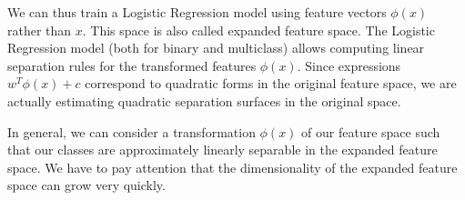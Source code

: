 We can thus train a Logistic Regression model using feature vectors $\phi(x)$ rather than $x$. This space is also called expanded feature space. The Logistic Regression model (both for binary and multiclass) allows computing linear separation rules for the transformed features $\phi(x)$. Since expressions $w^T \phi(x) + c$ correspond to quadratic forms in the original feature space, we are actually estimating quadratic separation surfaces in the original space.

In general, we can consider a transformation $\phi(x)$ of our feature space such that our classes are approximately linearly separable in the expanded feature space. We have to pay attention that the dimensionality of the expanded feature space can grow very quickly.
